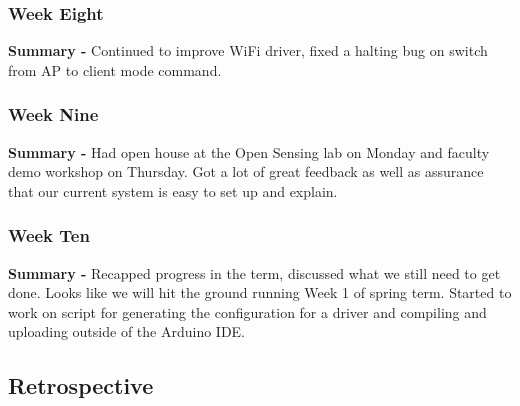 \documentclass[onecolumn, draftclsnofoot,10pt, compsoc]{IEEEtran}
\begin{document}
\subsubsection*{Week Eight}
    \begin{adjustwidth}{2.5em}{0pt}
    \textbf{Summary -} Continued to improve WiFi driver, fixed a halting bug on switch from AP to client mode command.
    \end{adjustwidth}

\subsubsection*{Week Nine}
    \begin{adjustwidth}{2.5em}{0pt}
    \textbf{Summary -} Had open house at the Open Sensing lab on Monday and faculty demo workshop on Thursday. Got a lot of great feedback as well as assurance that our current system is easy to set up and explain.
    \end{adjustwidth}

\subsubsection*{Week Ten}
    \begin{adjustwidth}{2.5em}{0pt}
    \textbf{Summary -} Recapped progress in the term, discussed what we still need to get done. Looks like we will hit the ground running Week 1 of spring term. Started to work on script for generating the configuration for a driver and compiling and uploading outside of the Arduino IDE.
    \end{adjustwidth}

\subsection{Retrospective}
\end{document}
